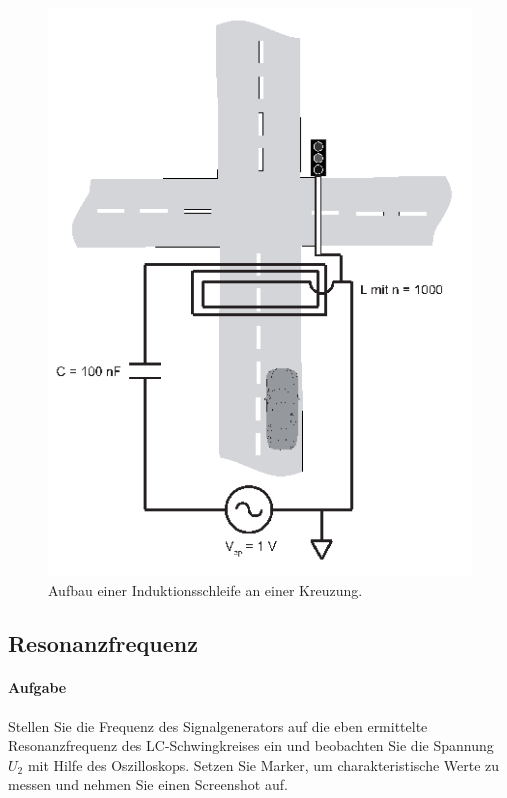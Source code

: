 \documentclass[10pt]{scrreprt}
\begin{document}
        \begin{center}
            \begin{figure}[H]
                \includegraphics[width=\textwidth]{Abbildung19.png}
                \caption{Aufbau einer Induktionsschleife an einer Kreuzung.}
                \label{fig:abb19}
            \end{figure}
        \end{center}

        \subsection{Resonanzfrequenz}
        \paragraph{Aufgabe}
        Stellen Sie die Frequenz des Signalgenerators auf die eben ermittelte Resonanzfrequenz
        des LC-Schwingkreises ein und beobachten Sie die Spannung $U_2$ mit Hilfe des
        Oszilloskops. Setzen Sie Marker, um charakteristische Werte zu messen und nehmen
        Sie einen Screenshot auf.
\end{document}
